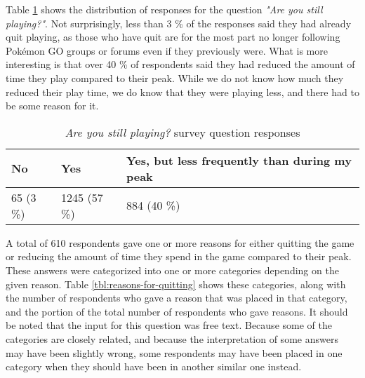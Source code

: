
Table \ref{tbl:still-playing} shows the distribution of responses for the question \emph{"Are you still playing?"}. Not surprisingly, less than 3 \% of the responses said they had already quit playing, as those who have quit are for the most part no longer following Pokémon GO groups or forums even if they previously were. What is more interesting is that over 40 \% of respondents said they had reduced the amount of time they play compared to their peak. While we do not know how much they reduced their play time, we do know that they were playing less, and there had to be some reason for it.

\begin{table}[h]
	\centering
	\begin{tabular}{|l|l|l|}
		\hline
		\textbf{No} & \textbf{Yes} & \textbf{Yes, but less frequently than during my peak}\\
		\hline\hline
		65 (3 \%) & 1245 (57 \%) & 884 (40 \%)\\\hline
	\end{tabular}
	\caption{\emph{Are you still playing?} survey question responses}
	\label{tbl:still-playing}
\end{table}

A total of 610 respondents gave one or more reasons for either quitting the game or reducing the amount of time they spend in the game compared to their peak. These answers were categorized into one or more categories depending on the given reason. Table \ref{tbl:reasons-for-quitting} shows these categories, along with the number of respondents who gave a reason that was placed in that category, and the portion of the total number of respondents who gave reasons. It should be noted that the input for this question was free text. Because some of the categories are closely related, and because the interpretation of some answers may have been slightly wrong, some respondents may have been placed in one category when they should have been in another similar one instead.

